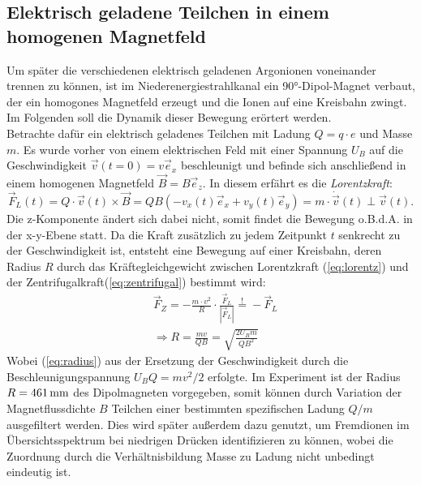 	\subsection{Elektrisch geladene Teilchen in einem homogenen Mag\-net\-feld}
		Um später die verschiedenen elektrisch geladenen Argonionen voneinander trennen zu können, ist im Niederenergiestrahlkanal ein 90°-Dipol-Magnet verbaut, der ein homogones Magnetfeld erzeugt und die Ionen auf eine Kreisbahn zwingt. Im Folgenden soll die Dynamik dieser Bewegung erörtert werden.\\
		Betrachte dafür ein elektrisch geladenes Teilchen mit Ladung $Q = q\cdot e$ und Masse $m$. Es wurde vorher von einem elektrischen Feld mit einer Spannung $U_B$ auf die Geschwindigkeit $\vec{v}(t=0)=v\vec{e}_x$ beschleunigt und befinde sich anschließend in einem homogenen Magnetfeld $\vec{B} = B \vec{e}_z$. In diesem erfährt es die \textit{Lorentzkraft}:
		\begin{equation}\label{eq:lorentz}
			\vec{F}_L(t) = Q\cdot\vec{v}(t)\times\vec{B} = QB(-v_x(t) \vec{e}_x + v_y(t)\vec{e}_y) = m\cdot \dot{\vec{v}}(t) \perp \vec{v}(t).
		\end{equation}
		Die z-Komponente ändert sich dabei nicht, somit findet die Bewegung o.B.d.A. in der x-y-Ebene statt. Da die Kraft zusätzlich zu jedem Zeitpunkt $t$ senkrecht zu der Geschwindigkeit ist, entsteht eine Bewegung auf einer Kreisbahn, deren Radius $R$ durch das Kräftegleichgewicht zwischen Lorentzkraft (\ref{eq:lorentz}) und der Zentrifugalkraft(\ref{eq:zentrifugal}) bestimmt wird:
		\begin{align}
			&\vec{F}_Z = - \frac{m\cdot v^2}{R}\cdot \frac{\vec{F}_L}{|\vec{F}_L|} \overset{!}{=} - \vec{F}_L \label{eq:zentrifugal}\\
			&\Rightarrow R = \frac{mv}{QB} = \sqrt{\frac{2U_Bm}{QB^2}}\label{eq:radius}
		\end{align}
		Wobei (\ref{eq:radius}) aus der Ersetzung der Geschwindigkeit durch die Beschleunigungspannung $U_BQ = mv^2/2$ erfolgte. Im Experiment ist der Radius $R = \unit[461]{mm}$ des Dipolmagneten vorgegeben, somit können durch Variation der Magnetflussdichte $B$ Teilchen einer bestimmten spezifischen Ladung $Q/m$ ausgefiltert werden. Dies wird später außerdem dazu genutzt, um Fremdionen im Übersichtsspektrum bei niedrigen Drücken identifizieren zu können, wobei die Zuordnung durch die Verhältnisbildung Masse zu Ladung nicht unbedingt eindeutig ist.
	
